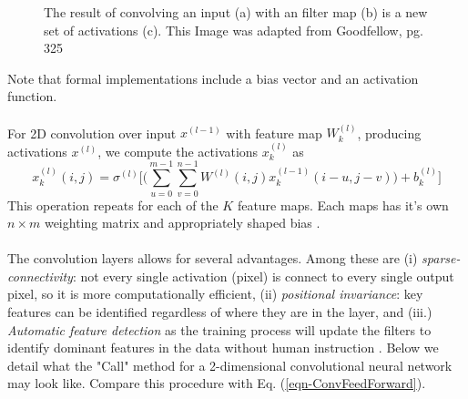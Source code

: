 \documentclass[12pt,letterpaper]{article}
\begin{document}
\begin{figure}[H]
\begin{center}
\end{center}
\caption{The result of convolving an input (a) with an filter map (b) is a new set of activations (c). This Image was adapted from Goodfellow, pg. 325 \cite{Goodfellow}}
\label{fig-2DConvExample}
\end{figure}
Note that formal implementations include a bias vector and an activation function.

\paragraph*{}For 2D convolution over input $x^{(l-1)}$ with feature map $W^{(l)}_k$, producing activations $x^{(l)}$, we compute the activations $x^{(l)}_{k}$ as \cite{Goodfellow}
\begin{equation}
\label{eqn-ConvFeedForward}
x^{(l)}_k(i,j) = \sigma^{(l)}\bigg[ \Big( \sum_{u=0}^{m-1} \sum_{v=0}^{n-1} W^{(l)}(i,j) x^{(l-1)}_k(i - u,j - v) \Big) + b^{(l)}_k \bigg]
\end{equation}
This operation repeats for each of the $K$ feature maps. Each maps has it's own $n \times m$ weighting matrix and appropriately shaped bias .

\paragraph*{}The convolution layers allows for several advantages. Among these are (i) \textit{sparse-connectivity}: not every single activation (pixel) is connect to every single output pixel, so it is more computationally efficient, (ii) \textit{positional invariance}: key features can be identified regardless of where they are in the layer, and (iii.) \textit{Automatic feature detection} as the training process will update the filters to identify dominant features in the data without human instruction \cite{Geron,Goodfellow,Loy}. Below we detail what the "Call" method for a 2-dimensional convolutional neural network may look like. Compare this procedure with Eq. (\ref{eqn-ConvFeedForward}).
\end{document}
